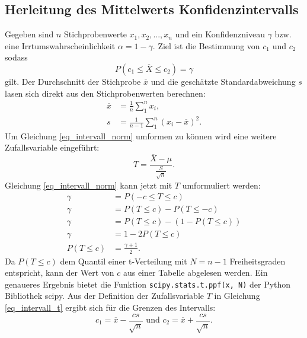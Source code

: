 \documentclass[10pt,twocolumn]{scrartcl}
\begin{document}
	\subsection{Herleitung des Mittelwerts Konfidenzintervalls}
		\label{chap_interval_mean_math}
		Gegeben sind $n$ Stichprobenwerte $x_1, x_2, ..., x_n$ und ein Konfidenzniveau $\gamma$ bzw. eine Irrtumswahrscheinlichkeit $\alpha = 1 - \gamma$.
		Ziel ist die Bestimmung von $c_1$ und $c_2$ sodass
		\begin{equation} \label{eq_intervall_norm}
		P(c_1 \le \overline{X} \le c_2) = \gamma
		\end{equation}
		gilt.
		Der Durchschnitt der Stichprobe $\overline{x}$ und die geschätzte Standardabweichung $s$ lasen sich direkt aus den Stichprobenwerten berechnen:
		\begin{align}
		\overline{x} &=  \frac{1}{n} \sum_1^n{x_i} , \\
		s &= \frac{1}{n-1} \sum_1^n{(x_i - \overline{x})^2} .
		\end{align}
		Um Gleichung \ref{eq_intervall_norm} umformen zu können wird eine weitere Zufallsvariable eingeführt:
		\begin{equation} \label{eq_intervall_t}
		T = \frac{\overline{X} - \mu}{\frac{S}{\sqrt{n}}} .
		\end{equation}
		Gleichung \ref{eq_intervall_norm} kann jetzt mit $T$ umformuliert werden:
		\begin{align}
		\gamma &= P(-c \le T \le c) \\ \nonumber
		\gamma &= P(T \le c) - P(T \le -c) \\ \nonumber
		\gamma &= P(T \le c) - (1 - P(T \le c)) \\ \nonumber
		\gamma &= 1 - 2 P(T \le c) \\
		P(T \le c) &= \frac{\gamma + 1}{2} .
		\end{align}
		Da $P(T \le c)$ dem Quantil einer t-Verteilung mit $N = n-1$ Freiheitsgraden entspricht, kann der Wert von $c$ aus einer Tabelle abgelesen werden. Ein genaueres Ergebnis bietet die Funktion \texttt{scipy.stats.t.ppf(x, N)} der Python Bibliothek scipy.
		Aus der Definition der Zufallsvariable $T$ in Gleichung \ref{eq_intervall_t} ergibt sich für die Grenzen des Intervalls:
		\begin{equation}
		c_1 = \overline{x} - \frac{cs}{\sqrt{n}} \mbox{ und } c_2 = \overline{x} + \frac{cs}{\sqrt{n}}.
		\end{equation}
\end{document}
